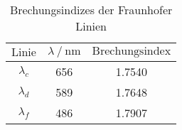 \begin{table}[H]
  \centering
  \caption{Brechungsindizes der Fraunhofer Linien}
  \label{tab:tabe3}
    \begin{tabular}{c S S}
    \toprule
    $ \text{Linie} $ & $ \lambda \: / \: \text{nm} $ & $ \text{Brechungsindex} $ \\
    \midrule
    $\lambda_{c}$ & 656 & 1.7540 \\
    $\lambda_{d}$ & 589 & 1.7648 \\
    $\lambda_{f}$ & 486 & 1.7907 \\

          \bottomrule
    \end{tabular}
  \end{table}
